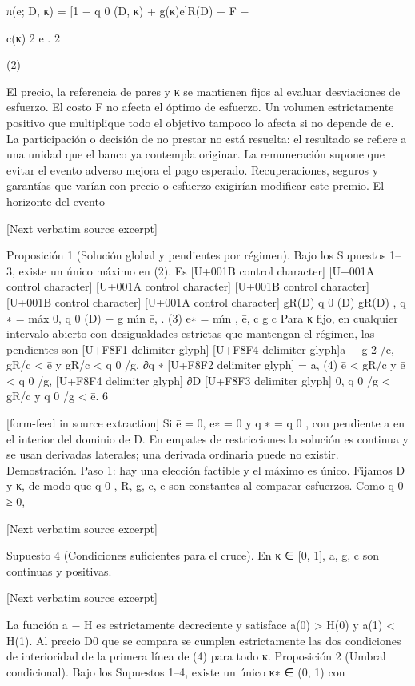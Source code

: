 \documentclass[10pt]{article}
\begin{document}
\begin{ReviewVerbatim}
π(e; D, κ) = [1 − q 0 (D, κ) + g(κ)e]R(D) − F −

c(κ) 2
e .
2

(2)

El precio, la referencia de pares y κ se mantienen ﬁjos al evaluar desviaciones de esfuerzo.
El costo F no afecta el óptimo de esfuerzo. Un volumen estrictamente positivo que multiplique
todo el objetivo tampoco lo afecta si no depende de e. La participación o decisión de no prestar
no está resuelta: el resultado se reﬁere a una unidad que el banco ya contempla originar. La remuneración supone que evitar el evento adverso mejora el pago esperado. Recuperaciones, seguros y
garantías que varían con precio o esfuerzo exigirían modiﬁcar este premio. El horizonte del evento

[Next verbatim source excerpt]


Proposición 1 (Solución global y pendientes por régimen). Bajo los Supuestos 1–3, existe un
único máximo en (2). Es
[U+001B control character]
[U+001A control character]
[U+001A control character]
[U+001B control character][U+001B control character]
[U+001A control character]
gR(D)
q 0 (D)
gR(D)
,
q ∗ = máx 0, q 0 (D) − g mı́n ē,
.
(3)
e∗ = mı́n
, ē,
c
g
c
Para κ ﬁjo, en cualquier intervalo abierto con desigualdades estrictas que mantengan el régimen,
las pendientes son
[U+F8F1 delimiter glyph]
[U+F8F4 delimiter glyph]a − g 2 /c, gR/c < ē y gR/c < q 0 /g,
∂q ∗ [U+F8F2 delimiter glyph]
= a,
(4)
ē < gR/c y ē < q 0 /g,
[U+F8F4 delimiter glyph]
∂D
[U+F8F3 delimiter glyph]
0,
q 0 /g < gR/c y q 0 /g < ē.
6


[form-feed in source extraction]
Si ē = 0, e∗ = 0 y q ∗ = q 0 , con pendiente a en el interior del dominio de D. En empates de
restricciones la solución es continua y se usan derivadas laterales; una derivada ordinaria puede
no existir.
Demostración. Paso 1: hay una elección factible y el máximo es único.
Fijamos D y κ, de modo que q 0 , R, g, c, ē son constantes al comparar esfuerzos. Como q 0 ≥ 0,

[Next verbatim source excerpt]

Supuesto 4 (Condiciones suﬁcientes para el cruce). En κ ∈ [0, 1], a, g, c son continuas y positivas.

[Next verbatim source excerpt]

La función a − H es estrictamente decreciente y satisface a(0) > H(0) y a(1) < H(1). Al precio D0
que se compara se cumplen estrictamente las dos condiciones de interioridad de la primera línea de
(4) para todo κ.
Proposición 2 (Umbral condicional). Bajo los Supuestos 1–4, existe un único κ∗ ∈ (0, 1) con


\end{ReviewVerbatim}
\end{document}
